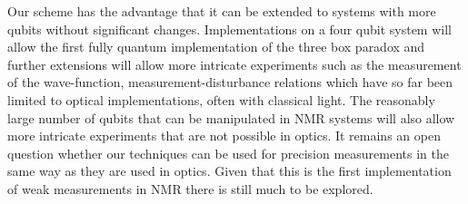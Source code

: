 \documentclass[aps,pra,12pt,onecolumn,showpacs,superscriptaddress,floatfix,footinbib,subfigure]{revtex4}
\begin{document}
Our scheme has the advantage that it can be extended to systems with more qubits without significant changes.  Implementations on a four qubit system will allow the first fully quantum  implementation of the three box paradox  and further extensions will allow more intricate experiments such as the measurement of the wave-function,  measurement-disturbance relations which have so far been limited to optical implementations, often with classical light. The reasonably large number of qubits  that can be manipulated   in NMR systems will also allow more intricate experiments that  are not possible in optics.  It remains an open question whether our techniques can be used for precision measurements in the same way as they are used in optics.  Given that this is the first implementation of weak measurements in NMR there is still much to be explored.
\end{document}
